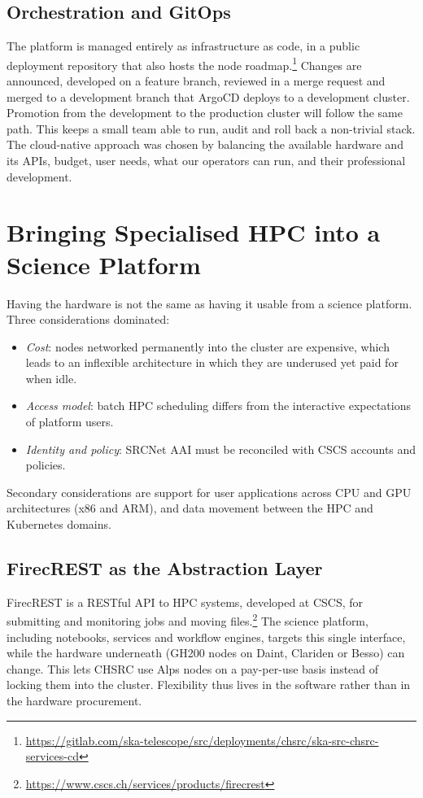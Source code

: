\documentclass[11pt,twoside]{article}
\begin{document}
\subsection{Orchestration and GitOps}
The platform is managed entirely as infrastructure as code, in a public deployment repository that also hosts the node roadmap.\footnote{\url{https://gitlab.com/ska-telescope/src/deployments/chsrc/ska-src-chsrc-services-cd}} Changes are announced, developed on a feature branch, reviewed in a merge request and merged to a development branch that ArgoCD deploys to a development cluster. Promotion from the development to the production cluster will follow the same path. This keeps a small team able to run, audit and roll back a non-trivial stack. The cloud-native approach was chosen by balancing the available hardware and its APIs, budget, user needs, what our operators can run, and their professional development.

\section{Bringing Specialised HPC into a Science Platform}\label{sec:hpc}

Having the hardware is not the same as having it usable from a science platform. Three considerations dominated:
\begin{itemize}
\item \emph{Cost}: nodes networked permanently into the cluster are expensive, which leads to an inflexible architecture in which they are underused yet paid for when idle.
\item \emph{Access model}: batch HPC scheduling differs from the interactive expectations of platform users.
\item \emph{Identity and policy}: SRCNet AAI must be reconciled with CSCS accounts and policies.
\end{itemize}
Secondary considerations are support for user applications across CPU and GPU architectures (x86 and ARM), and data movement between the HPC and Kubernetes domains.

\subsection{FirecREST as the Abstraction Layer}
FirecREST \citep{Cruz2020FirecREST} is a RESTful API to HPC systems, developed at CSCS, for submitting and monitoring jobs and moving files.\footnote{\url{https://www.cscs.ch/services/products/firecrest}} The science platform, including notebooks, services and workflow engines, targets this single interface, while the hardware underneath (GH200 nodes on Daint, Clariden or Besso) can change. This lets CHSRC use Alps nodes on a pay-per-use basis instead of locking them into the cluster. Flexibility thus lives in the software rather than in the hardware procurement.
\end{document}
